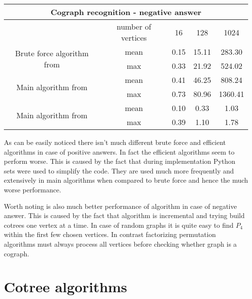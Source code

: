 \begin{center}

    \begin{tabular}{ |c|c|c|c|c|}
        \hline
        \multicolumn{5}{|c|}{Cograph recognition - negative answer}                                            \\
        \hline
                                                                 & number of vertices & 16   & 128   & 1024    \\
        \hline
        \multirow{2}{*}{Brute force algorithm from \cite{habib}} & mean               & 0.15 & 15.11 & 283.30  \\
                                                                 & max                & 0.33 & 21.92 & 524.02  \\
        \hline
        \multirow{2}{*}{Main algorithm from \cite{habib}}        & mean               & 0.41 & 46.25 & 808.24  \\
                                                                 & max                & 0.73 & 80.96 & 1360.41 \\
        \hline
        \multirow{2}{*}{Main algorithm from \cite{corneil}}      & mean               & 0.10 & 0.33  & 1.03    \\
                                                                 & max                & 0.39 & 1.10  & 1.78    \\

        \hline
    \end{tabular}
\end{center}

As can be easily noticed there isn't much different brute force and efficient algorithms in case of positive answers. In fact the efficient algorithms seem to perform worse. This is caused by the fact that during implementation Python sets were used to simplify the code. They are used much more frequently and extensively in main algorithms when compared to brute force and hence the much worse performance.

Worth noting is also much better performance of \cite{corneil} algorithm in case of negative answer. This is caused by the fact that algorithm is incremental and trying build cotrees one vertex at a time. In case of random graphs it is quite easy to find $P_4$ within the first few chosen vertices. In contrast factorizing permutation algorithms must always process all vertices before checking whether graph is a cograph.

\section{Cotree algorithms}

